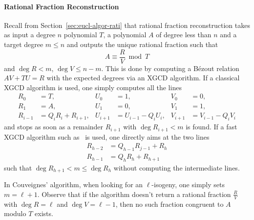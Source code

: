 \paragraph{Rational Fraction Reconstruction}
Recall from Section~\ref{sec:eucl-algor-rati} that rational fraction
reconstruction takes as input a degree $n$ polynomial $T$, a
polynomial $A$ of degree less than $n$ and a target degree $m\le n$
and outputs the unique rational fraction such that
\begin{equation*}
  A \equiv \frac{R}{V} \bmod T
\end{equation*}
and $\deg R < m$, $\deg V \le n-m$. This is done by computing a Bézout
relation $AV + TU = R$ with the expected degrees via an XGCD
algorithm. If a classical XGCD algorithm is used, one simply computes
all the lines
\begin{equation}
  \label{eq:XGCD}
  \begin{aligned}
    R_0 &= T, & U_0 &= 1, & V_0 &= 0,\\
    R_1 &= A, & U_1 &= 0, & V_1 &= 1,\\
    R_{i-1} &= Q_iR_i + R_{i+1}, & U_{i+1} &= U_{i-1}-Q_iU_i, & V_{i+1} &= V_{i-1}-Q_iV_i
  \end{aligned}
\end{equation}
and stops as soon as a remainder $R_{i+1}$ with $\deg R_{i+1}<m$ is
found. If a fast XGCD algorithm such as~\cite[$\S$11.1]{vzGG} is used,
one directly aims at the two lines
\begin{equation}
  \label{eq:FastGCD}
  \begin{aligned}
    R_{h-2} &= Q_{h-1}R_{j-1} + R_h\\
    R_{h-1} &= Q_hR_h + R_{h+1}
  \end{aligned}
\end{equation}
such that $\deg R_{h+1} < m \le \deg R_h$ without computing the
intermediate lines.

In Couveignes' algorithm, when looking for an $\ell$-isogeny, one
simply sets $m=\ell+1$. Observe that if the algorithm doesn't return a
rational fraction $\frac{R}{V}$ with $\deg R = \ell$ and $\deg V =
\ell -1 $, then no such fraction congruent to $A$ modulo $T$ exists.

